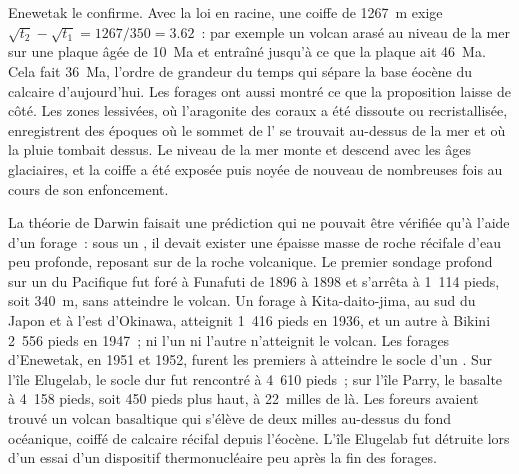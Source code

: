 Enewetak le confirme. Avec la loi en racine, une coiffe de \qty{1267}{m} exige $\sqrt{t_2} - \sqrt{t_1} =
1267/350 = 3.62$~: par exemple un volcan arasé au niveau de la mer sur une plaque âgée de \qty{10}{Ma} et entraîné jusqu'à ce que la plaque ait \qty{46}{Ma}.
Cela fait \qty{36}{Ma}, l'ordre de grandeur du temps qui sépare la base éocène du
calcaire d'aujourd'hui. Les forages ont aussi montré ce que la proposition laisse de
côté. Les zones lessivées, où l'aragonite des coraux a été dissoute ou recristallisée,
enregistrent des époques où le sommet de l' se trouvait au-dessus de la mer et où la
pluie tombait dessus. Le niveau de la mer monte et descend avec les âges glaciaires, et la
coiffe a été exposée puis noyée de nouveau de nombreuses fois au cours de son enfoncement.

\begin{history}
La théorie de Darwin faisait une prédiction qui ne pouvait être vérifiée qu'à l'aide d'un forage~: sous un
, il devait exister une épaisse masse de roche récifale d'eau peu profonde, reposant sur de la roche
volcanique. Le premier sondage profond sur un  du Pacifique fut foré à Funafuti de 1896 à 1898 et
s'arrêta à 1~114 pieds, soit \qty{340}{m}, sans atteindre le volcan. Un forage à Kita-daito-jima, au sud du
Japon et à l'est d'Okinawa, atteignit 1~416 pieds en 1936, et un autre à Bikini 2~556 pieds en 1947~; ni l'un
ni l'autre n'atteignit le volcan. Les forages d'Enewetak, en 1951 et 1952, furent les premiers à atteindre le
socle d'un . Sur l'île Elugelab, le socle dur fut rencontré à 4~610 pieds~; sur l'île Parry, le basalte
à 4~158 pieds, soit 450 pieds plus haut, à \num{22}~milles de là. Les foreurs avaient trouvé un volcan
basaltique qui s'élève de deux milles au-dessus du fond océanique, coiffé de calcaire récifal depuis l'éocène.
L'île Elugelab fut détruite lors d'un essai d'un dispositif thermonucléaire peu après la fin des forages.
\end{history}

